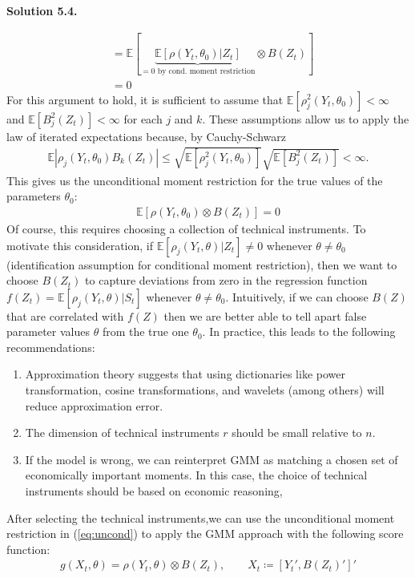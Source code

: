 \documentclass[11pt]{article}
\newenvironment{solution}[1]
    {\bigskip\noindent\textbf{Solution #1.} \par}
    {\medskip}
\newcommand{\ev}{\mathbb{E}}
\begin{document}
\begin{solution}{5.4}
\begin{align*}
    &= \ev\left[ \underbrace{\ev\left[\rho(Y_t, \theta_0)|Z_t\right]}_{=0\text{ by cond. moment restriction}}   \otimes B(Z_t)\right] \\
    &= 0
\end{align*}
For this argument to hold, it is sufficient to assume that $\ev[\rho_j^2(Y_t,\theta_0)] < \infty$ and $\ev[B_j^2(Z_t)] < \infty$ for each $j$ and $k$. These assumptions allow us to apply the law of iterated expectations because, by Cauchy-Schwarz 
\begin{align*}
    \ev | \rho_j(Y_t,\theta_0)B_k(Z_t)| \leq \sqrt{\ev[\rho_j^2(Y_t,\theta_0)]}\sqrt{\ev[B_j^2(Z_t)]} < \infty.
\end{align*}
This gives us the unconditional moment restriction for the true values of the parameters $\theta_0:$
\begin{align}
    \ev\left[\rho(Y_t, \theta_0) \otimes B(Z_t) \right] = 0 \label{eq:uncond}
\end{align}
Of course, this requires choosing a collection of technical instruments. To motivate this consideration, if $\ev[\rho_j(Y_t,\theta)|Z_t]\neq 0$ whenever $\theta \neq \theta_0$ (identification assumption for conditional moment restriction), then we want to choose $B(Z_t)$ to capture deviations from zero in the regression function $f(Z_t) = \ev[\rho_j(Y_t,\theta)|S_t]$ whenever $\theta \neq \theta_0.$ Intuitively, if we can choose $B(Z)$ that are correlated with $f(Z)$ then we are better able to tell apart false parameter values $\theta$ from the true one $\theta_0.$ In practice, this leads to the following recommendations:
\begin{enumerate}
    \item Approximation theory suggests that using dictionaries like power transformation, cosine transformations, and wavelets (among others) will reduce approximation error. 
    \item The dimension of technical instruments $r$ should be small relative to $n$.
    \item If the model is wrong, we can reinterpret GMM as matching a chosen set of economically important moments. In this case, the choice of technical instruments should be based on economic reasoning,
\end{enumerate}
After selecting the technical instruments,we can use the unconditional moment restriction in (\ref{eq:uncond}) to apply the GMM approach with the following score function:
\begin{align*}
    g(X_t,\theta) = \rho(Y_t,\theta) \otimes B(Z_t), \qquad X_t \coloneq [Y_t', B(Z_t)']'
\end{align*}


\end{solution}
\end{document}
